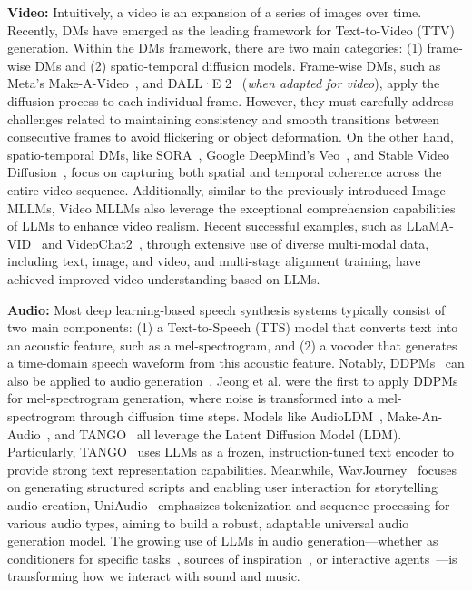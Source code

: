 \textbf{Video:} 
Intuitively, a video is an expansion of a series of images over time. Recently, DMs have emerged as the leading framework for Text-to-Video (TTV) generation. Within the DMs framework, there are two main categories: (1) frame-wise DMs and (2) spatio-temporal diffusion models. Frame-wise DMs, such as Meta’s Make-A-Video~\cite{singer2022make}, and DALL·E 2~\cite{openai2023dalle2} (\textit{when adapted for video}), apply the diffusion process to each individual frame. However, they must carefully address challenges related to maintaining consistency and smooth transitions between consecutive frames to avoid flickering or object deformation. On the other hand, spatio-temporal DMs, like SORA~\cite{brooks2024video}, Google DeepMind’s Veo~\cite{deepmind2023veo}, and Stable Video Diffusion~\cite{blattmann2023stable}, focus on capturing both spatial and temporal coherence across the entire video sequence. Additionally, similar to the previously introduced Image MLLMs, Video MLLMs also leverage the exceptional comprehension capabilities of LLMs to enhance video realism. Recent successful examples, such as LLaMA-VID~\cite{li2025llama} and VideoChat2~\cite{li2024mvbench}, through extensive use of diverse multi-modal data, including text, image, and video, and multi-stage alignment training, have achieved improved video understanding based on LLMs.

\textbf{Audio:}  
Most deep learning-based speech synthesis systems typically consist of two main components: (1) a Text-to-Speech (TTS) model that converts text into an acoustic feature, such as a mel-spectrogram, and (2) a vocoder that generates a time-domain speech waveform from this acoustic feature. Notably, DDPMs~\cite{ho2020denoising} can also be applied to audio generation~\cite{jeong2021diff}. Jeong et al. were the first to apply DDPMs for mel-spectrogram generation, where noise is transformed into a mel-spectrogram through diffusion time steps. Models like AudioLDM~\cite{liu2023audioldm}, Make-An-Audio~\cite{huang2023make}, and TANGO~\cite{ghosal2023text} all leverage the Latent Diffusion Model (LDM). Particularly, TANGO~\cite{ghosal2023text} uses LLMs as a frozen, instruction-tuned text encoder to provide strong text representation capabilities. Meanwhile, WavJourney~\cite{liu2023wavjourney} focuses on generating structured scripts and enabling user interaction for storytelling audio creation, UniAudio~\cite{yang2023uniaudio} emphasizes tokenization and sequence processing for various audio types, aiming to build a robust, adaptable universal audio generation model. The growing use of LLMs in audio generation—whether as conditioners for specific tasks~\cite{ghosal2023text}, sources of inspiration~\cite{yang2023uniaudio}, or interactive agents~\cite{liu2023wavjourney}—is transforming how we interact with sound and music.

